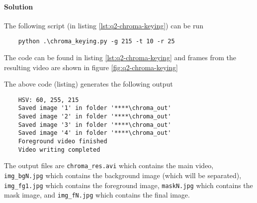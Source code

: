 \paragraph{Solution} The following script (in listing \ref{lst:q2-chroma-keying}) can be run

\begin{verbatim}
    python .\chroma_keying.py -g 215 -t 10 -r 25
\end{verbatim}

The code can be found in listing \ref{lst:q2-chroma-keying} and frames from the resulting video are shown in figure \ref{fig:q2-chroma-keying}



The above code (listing) generates the following output

\begin{verbatim}
    HSV: 60, 255, 215
    Saved image '1' in folder '****\chroma_out'
    Saved image '2' in folder '****\chroma_out'
    Saved image '3' in folder '****\chroma_out'
    Saved image '4' in folder '****\chroma_out'
    Foreground video finished
    Video writing completed
\end{verbatim}

The output files are \texttt{chroma\_res.avi} which contains the main video, \texttt{img\_bgN.jpg} which contains the background image (which will be separated), \texttt{img\_fg1.jpg} which contains the foreground image, \texttt{maskN.jpg} which contains the mask image, and \texttt{img\_fN.jpg} which contains the final image.

